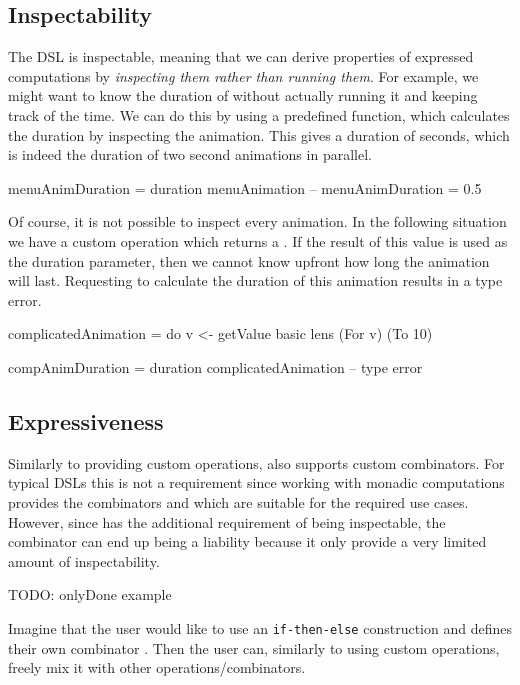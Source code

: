 \subsection{Inspectability}

The DSL is inspectable, meaning that we can derive properties of expressed computations by \emph{inspecting them rather than running them}. For example, we might want to know the duration of  without actually running it and keeping track of the time. We can do this by using a predefined  function, which calculates the duration by inspecting the animation. This gives a duration of  seconds, which is indeed the duration of two  second animations in parallel.

\begin{spec}
menuAnimDuration = duration menuAnimation
-- menuAnimDuration = 0.5 
\end{spec}

Of course, it is not possible to inspect every animation. In the following situation we have a custom operation  which returns a . If the result of this value is used as the duration parameter, then we cannot know upfront how long the animation will last. Requesting to calculate the duration of this animation results in a type error.

\begin{spec}
complicatedAnimation = do
  v <- getValue
  basic lens (For v) (To 10)

compAnimDuration = duration complicatedAnimation
-- type error
\end{spec}

\subsection{Expressiveness}
\label{sec:customcomb}

Similarly to providing custom operations, \dsl{} also supports custom combinators. For typical DSLs this is not a requirement since working with monadic computations provides the combinators \hs{>>=} and  which are suitable for the required use cases. However, since \dsl{} has the additional requirement of being inspectable, the \hs{>>=} combinator can end up being a liability because it only provide a very limited amount of inspectability.

TODO: onlyDone example

Imagine that the user would like to use an \texttt{if-then-else} construction and defines their own combinator . Then the user can, similarly to using custom operations, freely mix it with other operations/combinators.

